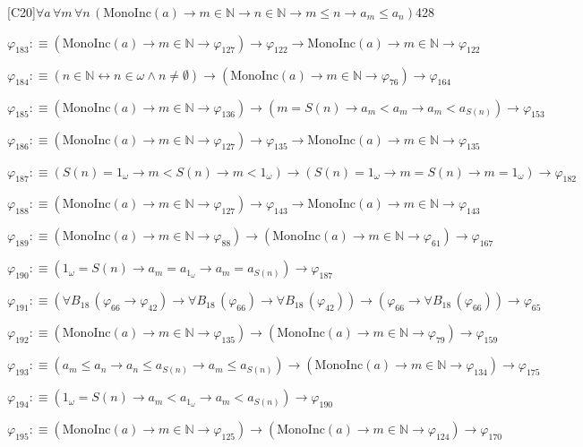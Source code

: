 \begin{fullproof}{[C20]}{$\forall a\,\forall m\,\forall n\,(\mathrm{MonoInc}(a) \to m \in \mathbb{N} \to n \in \mathbb{N} \to m \leq n \to a_{m} \leq a_{n})$}{428}
\begin{abbrevlist}
\item $\varphi_{183} :\equiv (\mathrm{MonoInc}(a) \to m \in \mathbb{N} \to \varphi_{127}) \to \varphi_{122} \to \mathrm{MonoInc}(a) \to m \in \mathbb{N} \to \varphi_{122}$
\item $\varphi_{184} :\equiv (n \in \mathbb{N} \leftrightarrow n \in \omega \land n \neq \emptyset) \to (\mathrm{MonoInc}(a) \to m \in \mathbb{N} \to \varphi_{76}) \to \varphi_{164}$
\item $\varphi_{185} :\equiv (\mathrm{MonoInc}(a) \to m \in \mathbb{N} \to \varphi_{136}) \to (m = S(n) \to a_{m} < a_{m} \to a_{m} < a_{S(n)}) \to \varphi_{153}$
\item $\varphi_{186} :\equiv (\mathrm{MonoInc}(a) \to m \in \mathbb{N} \to \varphi_{127}) \to \varphi_{135} \to \mathrm{MonoInc}(a) \to m \in \mathbb{N} \to \varphi_{135}$
\item $\varphi_{187} :\equiv (S(n) = 1_{\omega} \to m < S(n) \to m < 1_{\omega}) \to (S(n) = 1_{\omega} \to m = S(n) \to m = 1_{\omega}) \to \varphi_{182}$
\item $\varphi_{188} :\equiv (\mathrm{MonoInc}(a) \to m \in \mathbb{N} \to \varphi_{127}) \to \varphi_{143} \to \mathrm{MonoInc}(a) \to m \in \mathbb{N} \to \varphi_{143}$
\item $\varphi_{189} :\equiv (\mathrm{MonoInc}(a) \to m \in \mathbb{N} \to \varphi_{88}) \to (\mathrm{MonoInc}(a) \to m \in \mathbb{N} \to \varphi_{61}) \to \varphi_{167}$
\item $\varphi_{190} :\equiv (1_{\omega} = S(n) \to a_{m} = a_{1_{\omega}} \to a_{m} = a_{S(n)}) \to \varphi_{187}$
\item $\varphi_{191} :\equiv (\forall B_{18}\,(\varphi_{66} \to \varphi_{42}) \to \forall B_{18}\,(\varphi_{66}) \to \forall B_{18}\,(\varphi_{42})) \to (\varphi_{66} \to \forall B_{18}\,(\varphi_{66})) \to \varphi_{65}$
\item $\varphi_{192} :\equiv (\mathrm{MonoInc}(a) \to m \in \mathbb{N} \to \varphi_{135}) \to (\mathrm{MonoInc}(a) \to m \in \mathbb{N} \to \varphi_{79}) \to \varphi_{159}$
\item $\varphi_{193} :\equiv (a_{m} \leq a_{n} \to a_{n} \leq a_{S(n)} \to a_{m} \leq a_{S(n)}) \to (\mathrm{MonoInc}(a) \to m \in \mathbb{N} \to \varphi_{134}) \to \varphi_{175}$
\item $\varphi_{194} :\equiv (1_{\omega} = S(n) \to a_{m} < a_{1_{\omega}} \to a_{m} < a_{S(n)}) \to \varphi_{190}$
\item $\varphi_{195} :\equiv (\mathrm{MonoInc}(a) \to m \in \mathbb{N} \to \varphi_{125}) \to (\mathrm{MonoInc}(a) \to m \in \mathbb{N} \to \varphi_{124}) \to \varphi_{170}$

\end{abbrevlist}
\end{fullproof}
